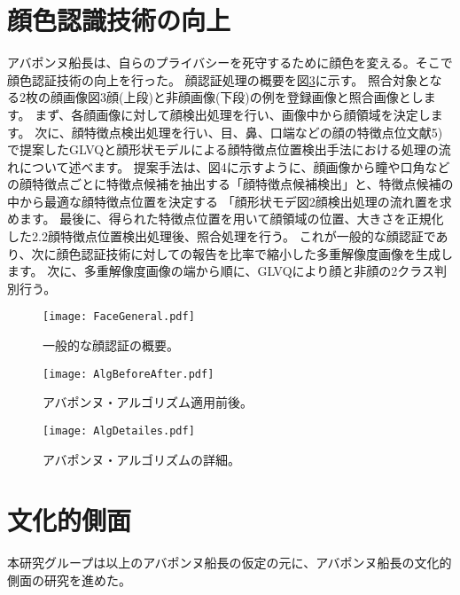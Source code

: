\section{顔色認識技術の向上}
アバポンヌ船長は、自らのプライバシーを死守するために顔色を変える。そこで顔色認証技術の向上を行った。
顔認証処理の概要を図\ref{fig:FaceGeneral}に示す。
照合対象となる2枚の顔画像図3顔(上段)と非顔画像(下段)の例を登録画像と照合画像とします。
まず、各顔画像に対して顔検出処理を行い、画像中から顔領域を決定します。
次に、顔特徴点検出処理を行い、目、鼻、口端などの顔の特徴点位文献5)で提案したGLVQと顔形状モデルによる顔特徴点位置検出手法における処理の流れについて述べます。
提案手法は、図4に示すように、顔画像から瞳や口角などの顔特徴点ごとに特徴点候補を抽出する「顔特徴点候補検出」と、特徴点候補の中から最適な顔特徴点位置を決定する
「顔形状モデ図2顔検出処理の流れ置を求めます。
最後に、得られた特徴点位置を用いて顔領域の位置、大きさを正規化した2.2顔特徴点位置検出処理後、照合処理を行う。
これが一般的な顔認証であり、次に顔色認証技術に対しての報告を比率で縮小した多重解像度画像を生成します。
次に、多重解像度画像の端から順に、GLVQにより顔と非顔の2クラス判別行う。

\begin{figure}
\centering
\texttt{[image: FaceGeneral.pdf]}
\caption{一般的な顔認証の概要。}
\label{fig:FaceGeneral}
\end{figure}

\begin{figure}
\centering
\texttt{[image: AlgBeforeAfter.pdf]}
\caption{アバポンヌ・アルゴリズム適用前後。}
\label{fig:FaceGeneral}
\end{figure}

\begin{figure}
\centering
\texttt{[image: AlgDetailes.pdf]}
\caption{アバポンヌ・アルゴリズムの詳細。}
\label{fig:FaceGeneral}
\end{figure}



\section{文化的側面}
本研究グループは以上のアバポンヌ船長の仮定の元に、アバポンヌ船長の文化的側面の研究を進めた。

